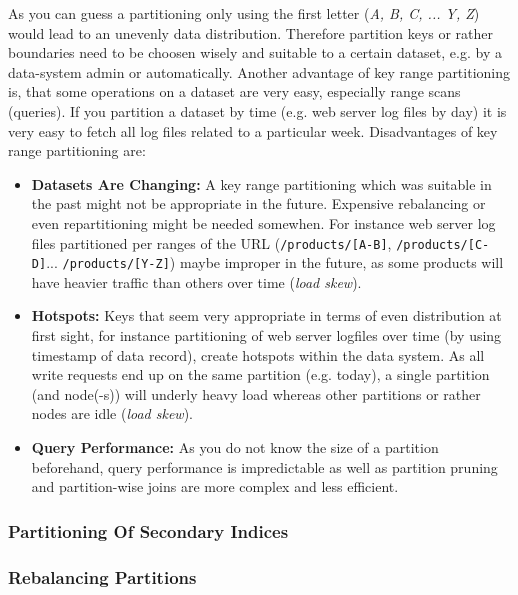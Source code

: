 {As you can guess a partitioning only using the first letter (\textit{A, B, C, ... Y, Z}) would lead to an unevenly data distribution. Therefore partition keys or rather boundaries need to be choosen wisely and suitable to a certain dataset, e.g. by a data-system admin or automatically. Another advantage of key range partitioning is, that some operations on a dataset are very easy, especially range scans (queries). If you partition a dataset by time (e.g. web server log files by day) it is very easy to fetch all log files related to a particular week.
Disadvantages of key range partitioning are:
\begin{itemize}
\item \textbf{Datasets Are Changing:} A key range partitioning which was suitable in the past might not be appropriate in the future. Expensive rebalancing or even repartitioning might be needed somewhen. For instance web server log files partitioned per ranges of the URL (\lstinline{/products/[A-B]}, \lstinline{/products/[C-D]}... \lstinline{/products/[Y-Z]}) maybe improper in the future, as some products will have heavier traffic than others over time (\textit{load skew}).
\item \textbf{Hotspots:} Keys that seem very appropriate in terms of even distribution at first sight, for instance partitioning of web server logfiles over time (by using timestamp of data record), create hotspots within the data system. As all write requests end up on the same partition (e.g. today), a single partition (and node(-s)) will underly heavy load whereas other partitions or rather nodes are idle (\textit{load skew}).
\item \textbf{Query Performance:} As you do not know the size of a partition beforehand, query performance is impredictable as well as partition pruning and partition-wise joins are more complex and less efficient. 
\end{itemize}

\label{tf_dds_partitioning_key_value_hash_of_key}

\subsubsection{Partitioning Of Secondary Indices}
\label{tf_dds_partitioning_secondary_indices}

\subsubsection{Rebalancing Partitions}
\label{tf_dds_partitioning_rebalancing}

}
